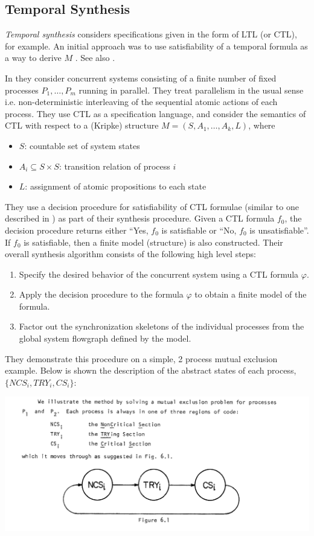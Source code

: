 \documentclass[10pt,a4paper]{article}
\begin{document}
\subsection{Temporal Synthesis}

\textit{Temporal synthesis} considers specifications given in the form of LTL (or CTL), for example. An initial approach was to use satisfiability of a temporal formula as a way to derive $M$ \cite{1981clarkemerson}. 
See also \cite{1984mannawolper}. 

In \cite{1981clarkemerson} they consider concurrent systems consisting of a finite number of fixed processes $P_1,\dots,P_m$ running in parallel. They treat parallelism in the usual sense i.e. non-deterministic interleaving of the sequential atomic actions of each process. They use CTL as a specification language, and consider the semantics of CTL with respect to a (Kripke) structure $M=(S,A_1,\dots,A_k,L)$, where
\begin{itemize}
    \item $S$: countable set of system states
    \item $A_i \subseteq S \times S$: transition relation of process $i$
    \item $L$: assignment of atomic propositions to each state
\end{itemize}
They use a decision procedure for satisfiability of CTL formulae (similar to one described in \cite{1981benari}) as part of their synthesis procedure. Given a CTL formula $f_0$, the decision procedure returns either ``Yes, $f_0$ is satisfiable or ``No, $f_0$ is unsatisfiable''. If $f_0$ is satisfiable, then a finite model (structure) is also constructed. Their overall synthesis algorithm consists of the following high level steps:
\begin{enumerate}
    \item Specify the desired behavior of the concurrent system using a CTL formula $\varphi$.
    \item Apply the decision procedure to the formula $\varphi$ to obtain a finite model of the formula.
    \item Factor out the synchronization skeletons of the individual processes from the global system flowgraph defined by the model.
\end{enumerate}
They demonstrate this procedure on a simple, 2 process mutual exclusion example. Below is shown the description of the abstract states of each process, $\{NCS_i, TRY_i, CS_i\}$: 
\begin{center}
    \includegraphics[scale=0.4]{images/mutex_processes.png}
\end{center}
\end{document}
